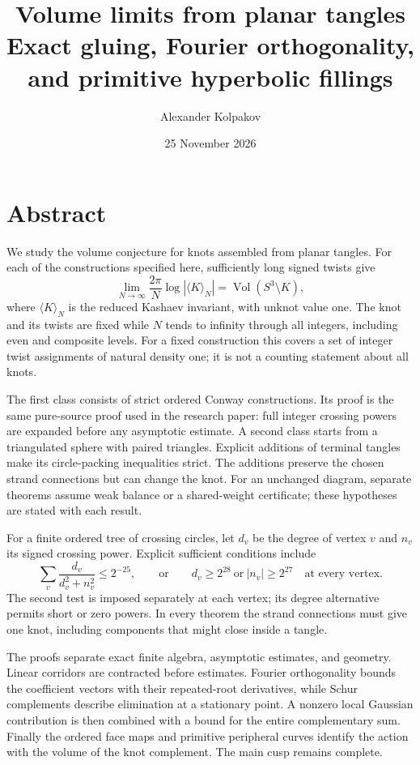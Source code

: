 \documentclass[11pt,oneside]{book}
\title{\Huge Volume limits from planar tangles\\[8pt]\Large Exact gluing, Fourier orthogonality,\\and primitive hyperbolic fillings}
\author{Alexander Kolpakov}
\date{25 November 2026}
\numberwithin{equation}{chapter}
\theoremstyle{definition}\newtheorem{definition}[theorem]{Definition}
\theoremstyle{remark}\newtheorem{remark}[theorem]{Remark}
\begin{document}
\hypersetup{pageanchor=false}
\maketitle
\clearpage
\hypersetup{pageanchor=true}
\frontmatter
\chapter*{Abstract}
We study the volume conjecture for knots assembled from planar tangles.
For each of the constructions specified here, sufficiently long signed
twists give
\[
 \lim_{N\to\infty}\frac{2\pi}{N}\log|\langle K\rangle_N|
       =\operatorname{Vol}(S^3\setminus K),
\]
where $\langle K\rangle_N$ is the reduced Kashaev invariant, with
unknot value one. The knot and its twists are fixed while $N$ tends
to infinity through all integers, including even and composite levels.
For a fixed construction this covers a set of integer twist assignments
of natural density one; it is not a counting statement about all knots.

The first class consists of strict ordered Conway constructions.
Its proof is the same pure-source proof used in the research paper:
full integer crossing powers are expanded before any asymptotic
estimate. A second class starts from a triangulated sphere
with paired triangles. Explicit additions of terminal tangles make
its circle-packing inequalities strict. The additions preserve the
chosen strand connections but can change the knot. For an unchanged
diagram, separate theorems assume weak balance or a shared-weight
certificate; these hypotheses are stated with each result.

For a finite ordered tree of crossing circles, let $d_v$ be the degree
of vertex $v$ and $n_v$ its signed crossing power. Explicit sufficient
conditions include
\[
 \sum_v\frac{d_v}{d_v^2+n_v^2}\le2^{-25},
 \qquad\text{or}\qquad
 d_v\ge2^{28}\ \text{or}\ |n_v|\ge2^{27}
       \quad\text{at every vertex}.
\]
The second test is imposed separately at each vertex; its degree
alternative permits short or zero powers. In every theorem the strand
connections must give one knot, including components that might close
inside a tangle.

The proofs separate exact finite algebra, asymptotic estimates, and
geometry. Linear corridors are contracted before estimates. Fourier
orthogonality bounds the coefficient vectors with their repeated-root
derivatives, while Schur complements describe elimination at a stationary
point. A nonzero local Gaussian contribution is then combined with a
bound for the entire complementary sum. Finally the ordered face maps
and primitive peripheral curves identify the action with the volume
of the knot complement. The main cusp remains complete.
\end{document}
